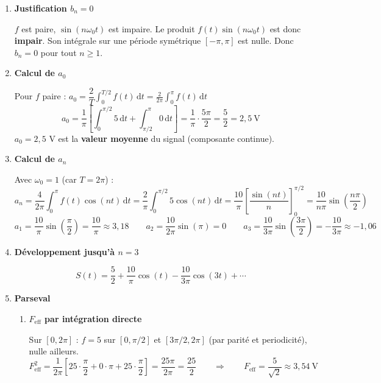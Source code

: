 \documentclass[a4paper,11pt]{article}
\begin{document}
\begin{enumerate}[label=\textbf{\arabic*.}]

\item \textbf{Justification $b_n = 0$}
\begin{tcolorbox}[corrigebox]
$f$ est paire, $\sin(n\omega_0 t)$ est impaire. Le produit $f(t)\sin(n\omega_0 t)$ est donc \textbf{impair}.
Son intégrale sur une période symétrique $[-\pi,\pi]$ est nulle. Donc $b_n = 0$ pour tout $n \geq 1$.
\end{tcolorbox}

\item \textbf{Calcul de $a_0$}
\begin{tcolorbox}[corrigebox]
Pour $f$ paire : $a_0 = \dfrac{2}{T}\displaystyle\int_0^{T/2}f(t)\,\mathrm{d}t = \frac{2}{2\pi}\int_0^{\pi}f(t)\,\mathrm{d}t$
\[
a_0 = \frac{1}{\pi}\left[\int_0^{\pi/2} 5\,\mathrm{d}t + \int_{\pi/2}^{\pi} 0\,\mathrm{d}t\right]
= \frac{1}{\pi}\cdot\frac{5\pi}{2} = \boxed{\frac{5}{2} = 2{,}5\ \text{V}}
\]
$a_0 = 2{,}5$ V est la \textbf{valeur moyenne} du signal (composante continue).
\end{tcolorbox}

\item \textbf{Calcul de $a_n$}
\begin{tcolorbox}[corrigebox]
Avec $\omega_0 = 1$ (car $T = 2\pi$) :
\[
a_n = \frac{4}{2\pi}\int_0^{\pi}f(t)\cos(nt)\,\mathrm{d}t
= \frac{2}{\pi}\int_0^{\pi/2} 5\cos(nt)\,\mathrm{d}t
= \frac{10}{\pi}\left[\frac{\sin(nt)}{n}\right]_0^{\pi/2}
= \boxed{\frac{10}{n\pi}\sin\!\left(\frac{n\pi}{2}\right)}
\]
\[
a_1 = \frac{10}{\pi}\sin\!\left(\frac{\pi}{2}\right) = \frac{10}{\pi} \approx 3{,}18
\qquad
a_2 = \frac{10}{2\pi}\sin(\pi) = 0
\qquad
a_3 = \frac{10}{3\pi}\sin\!\left(\frac{3\pi}{2}\right) = -\frac{10}{3\pi} \approx -1{,}06
\]
\end{tcolorbox}

\item \textbf{Développement jusqu'à $n = 3$}
\begin{tcolorbox}[corrigebox]
\[
S(t) = \frac{5}{2} + \frac{10}{\pi}\cos(t) - \frac{10}{3\pi}\cos(3t) + \cdots
\]
\end{tcolorbox}

\item \textbf{Parseval}

\begin{enumerate}[label=\textbf{\alph*)}]
\item \textbf{$F_{\mathrm{eff}}$ par intégration directe}
\begin{tcolorbox}[corrigebox]
Sur $[0, 2\pi]$ : $f = 5$ sur $[0,\pi/2]$ et $[3\pi/2,2\pi]$ (par parité et periodicité), nulle ailleurs.
\[
F_{\mathrm{eff}}^2 = \frac{1}{2\pi}\left[25\cdot\frac{\pi}{2} + 0\cdot\pi + 25\cdot\frac{\pi}{2}\right]
= \frac{25\pi}{2\pi} = \frac{25}{2}
\qquad\Longrightarrow\qquad
\boxed{F_{\mathrm{eff}} = \frac{5}{\sqrt{2}} \approx 3{,}54\ \text{V}}
\]
\end{tcolorbox}


\end{enumerate}
\end{enumerate}
\end{document}
